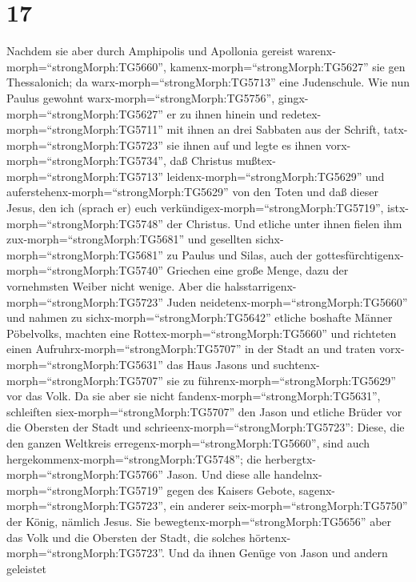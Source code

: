 \hypertarget{section-16}{%
\section{17}\label{section-16}}

 Nachdem sie aber durch Amphipolis und Apollonia gereist
warenx-morph=``strongMorph:TG5660'', kamenx-morph=``strongMorph:TG5627''
sie gen Thessalonich; da warx-morph=``strongMorph:TG5713'' eine
Judenschule.  Wie nun Paulus gewohnt
warx-morph=``strongMorph:TG5756'', gingx-morph=``strongMorph:TG5627'' er
zu ihnen hinein und redetex-morph=``strongMorph:TG5711'' mit ihnen an
drei Sabbaten aus der Schrift, 
tatx-morph=``strongMorph:TG5723'' sie ihnen auf und legte es ihnen
vorx-morph=``strongMorph:TG5734'', daß Christus
mußtex-morph=``strongMorph:TG5713'' leidenx-morph=``strongMorph:TG5629''
und auferstehenx-morph=``strongMorph:TG5629'' von den Toten und daß
dieser Jesus, den ich (sprach er) euch
verkündigex-morph=``strongMorph:TG5719'',
istx-morph=``strongMorph:TG5748'' der Christus.  Und etliche
unter ihnen fielen ihm zux-morph=``strongMorph:TG5681'' und gesellten
sichx-morph=``strongMorph:TG5681'' zu Paulus und Silas, auch der
gottesfürchtigenx-morph=``strongMorph:TG5740'' Griechen eine große
Menge, dazu der vornehmsten Weiber nicht wenige.  Aber die
halsstarrigenx-morph=``strongMorph:TG5723'' Juden
neidetenx-morph=``strongMorph:TG5660'' und nahmen zu
sichx-morph=``strongMorph:TG5642'' etliche boshafte Männer Pöbelvolks,
machten eine Rottex-morph=``strongMorph:TG5660'' und richteten einen
Aufruhrx-morph=``strongMorph:TG5707'' in der Stadt an und traten
vorx-morph=``strongMorph:TG5631'' das Haus Jasons und
suchtenx-morph=``strongMorph:TG5707'' sie zu
führenx-morph=``strongMorph:TG5629'' vor das Volk.  Da sie
aber sie nicht fandenx-morph=``strongMorph:TG5631'', schleiften
siex-morph=``strongMorph:TG5707'' den Jason und etliche Brüder vor die
Obersten der Stadt und schrieenx-morph=``strongMorph:TG5723'': Diese,
die den ganzen Weltkreis erregenx-morph=``strongMorph:TG5660'', sind
auch hergekommenx-morph=``strongMorph:TG5748'';  die
herbergtx-morph=``strongMorph:TG5766'' Jason. Und diese alle
handelnx-morph=``strongMorph:TG5719'' gegen des Kaisers Gebote,
sagenx-morph=``strongMorph:TG5723'', ein anderer
seix-morph=``strongMorph:TG5750'' der König, nämlich Jesus. 
Sie bewegtenx-morph=``strongMorph:TG5656'' aber das Volk und die
Obersten der Stadt, die solches hörtenx-morph=``strongMorph:TG5723''.
 Und da ihnen Genüge von Jason und andern geleistet
